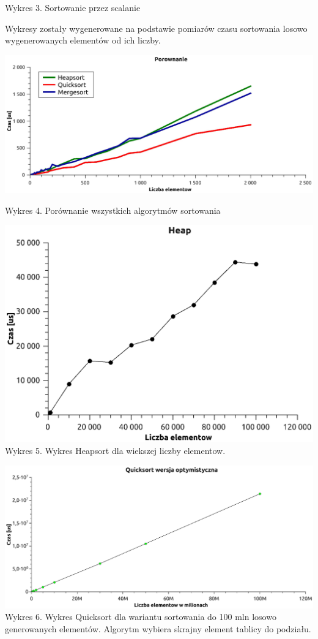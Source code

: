 \documentclass[12pt,a4paper]{article}
\begin{document}
Wykres 3. Sortowanie przez scalanie \newpage

Wykresy zostały wygenerowane na podstawie pomiarów czasu sortowania losowo wygenerowanych elementów od ich liczby.    \newline

\includegraphics[scale=0.6]{./wszystkie}

Wykres 4. Porównanie wszystkich algorytmów sortowania \newline

\includegraphics[scale=0.8]{./wiecejelem} \newline
Wykres 5. Wykres Heapsort dla wiekszej liczby elementow. \newline

\includegraphics[scale=0.4]{./qopt} \newline
Wykres 6. Wykres Quicksort dla wariantu sortowania do 100 mln losowo generowanych elementów. Algorytm wybiera skrajny element tablicy do podziału. \newpage
\end{document}
